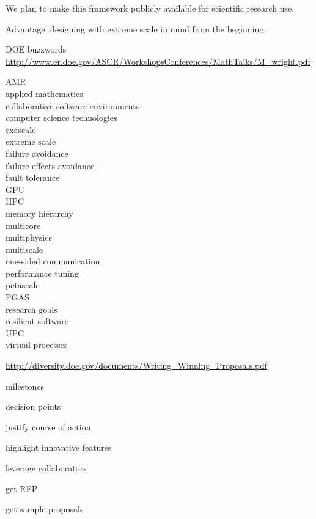 \documentclass{article}
\begin{document}
We plan to make this framework publicly available for scientific research use.

Advantage: designing with extreme scale in mind from the beginning.

DOE buzzwords
\url{http://www.er.doe.gov/ASCR/WorkshopsConferences/MathTalks/M\_wright.pdf}

AMR \\
applied mathematics\\
collaborative software environments\\
computer science technologies\\
exascale \\
extreme scale\\
failure avoidance \\
failure effects avoidance \\
fault tolerance\\
GPU \\
HPC \\
memory hierarchy\\
multicore\\
multiphysics \\
multiscale \\
one-sided communication\\
performance tuning\\
petascale \\
PGAS \\
research goals\\
resilient software \\
UPC \\
virtual processes \\


\url{http://diversity.doe.gov/documents/Writing\_Winning\_Proposals.pdf}

milestones

decision points

justify course of action

highlight innovative features

leverage collaborators

get RFP

get sample proposals
\end{document}
